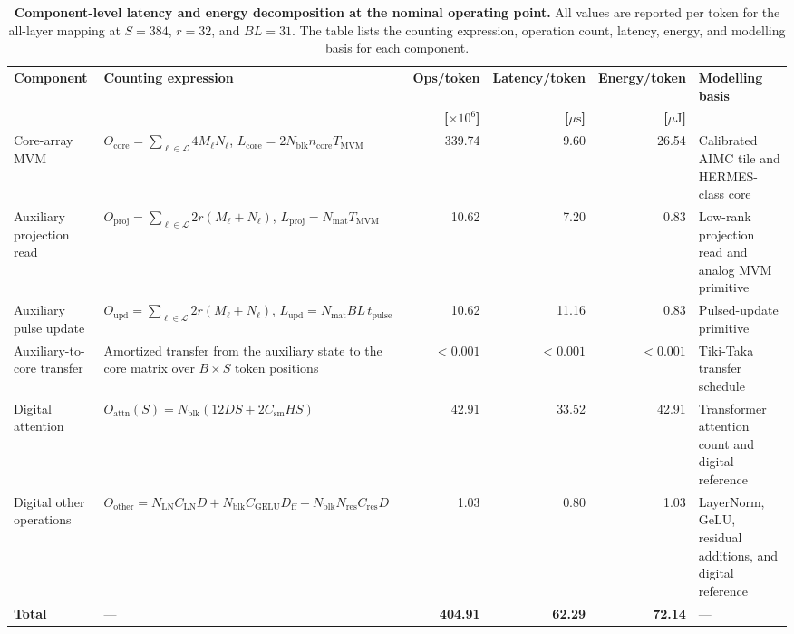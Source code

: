 \documentclass[AMA,LATO1COL]{WileyNJDv5}
\begin{document}
\begin{table}[!htbp]
\centering
\caption{\textbf{Component-level latency and energy decomposition at the nominal operating point.}
All values are reported per token for the all-layer mapping at \(S=384\), \(r=32\), and \(BL=31\). The table lists the counting expression, operation count, latency, energy, and modelling basis for each component.}
\label{tab:supp_component_decomposition}
{\small
\renewcommand{\arraystretch}{1.18}
\setlength{\tabcolsep}{3.6pt}
\begin{tabularx}{\textwidth}{@{}p{2.9cm}Y r r r p{3.2cm}@{}}
\toprule
\textbf{Component} &
\textbf{Counting expression} &
\textbf{Ops/token} &
\textbf{Latency/token} &
\textbf{Energy/token} &
\textbf{Modelling basis} \\
&
&
\textbf{[\(\times10^{6}\)]} &
\textbf{[\(\mu\mathrm{s}\)]} &
\textbf{[\(\mu\mathrm{J}\)]} &
\\
\midrule
Core-array MVM &
\(O_{\mathrm{core}}=\sum_{\ell\in\mathcal{L}}4M_{\ell}N_{\ell}\), 
\(L_{\mathrm{core}}=2N_{\mathrm{blk}}n_{\mathrm{core}}T_{\mathrm{MVM}}\) &
339.74 & 9.60 & 26.54 &
Calibrated AIMC tile and HERMES-class core \cite{klein2023alpine,khaddam2022hermescore} \\
Auxiliary projection read &
\(O_{\mathrm{proj}}=\sum_{\ell\in\mathcal{L}}2r(M_{\ell}+N_{\ell})\), 
\(L_{\mathrm{proj}}=N_{\mathrm{mat}}T_{\mathrm{MVM}}\) &
10.62 & 7.20 & 0.83 &
Low-rank projection read and analog MVM primitive \cite{hu2021lora,klein2023alpine} \\
Auxiliary pulse update &
\(O_{\mathrm{upd}}=\sum_{\ell\in\mathcal{L}}2r(M_{\ell}+N_{\ell})\), 
\(L_{\mathrm{upd}}=N_{\mathrm{mat}}BL\,t_{\mathrm{pulse}}\) &
10.62 & 11.16 & 0.83 &
Pulsed-update primitive \cite{gokmen2016rpu,rasch2024fastrobust} \\
Auxiliary-to-core transfer &
Amortized transfer from the auxiliary state to the core matrix over \(B\times S\) token positions &
\(<0.001\) & \(<0.001\) & \(<0.001\) &
Tiki-Taka transfer schedule \cite{gokmen2020tikitaka,rasch2024fastrobust} \\
Digital attention &
\(O_{\mathrm{attn}}(S)=N_{\mathrm{blk}}(12DS+2C_{\mathrm{sm}}HS)\) &
42.91 & 33.52 & 42.91 &
Transformer attention count and digital reference \cite{vaswani2017attention,horowitz2014computing} \\
Digital other operations &
\(O_{\mathrm{other}}=N_{\mathrm{LN}}C_{\mathrm{LN}}D+N_{\mathrm{blk}}C_{\mathrm{GELU}}D_{\mathrm{ff}}+N_{\mathrm{blk}}N_{\mathrm{res}}C_{\mathrm{res}}D\) &
1.03 & 0.80 & 1.03 &
LayerNorm, GeLU, residual additions, and digital reference \cite{horowitz2014computing} \\
\midrule
\textbf{Total} &
--- &
\textbf{404.91} & \textbf{62.29} & \textbf{72.14} &
--- \\
\bottomrule
\end{tabularx}
}
\vspace{0.35em}


\end{table}
\end{document}
